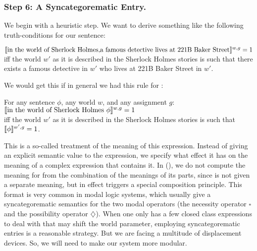 \subsubsection{Step 6: A Syncategorematic Entry.} \label{sec:sync-entry}

We begin with a heuristic step. We want to derive something like the following
truth-conditions for our sentence:

\ex $\llbracket \mbox{in the world of Sherlock Holmes,}\\
  \mbox{a famous detective lives at 221B Baker Street} \rrbracket^{w,g} = 1$\\
iff the world $w'$ as it is described in the Sherlock Holmes stories is such
that there exists a famous detective in $w'$ who lives at 221B Baker Street in
$w'$.
\xe

We would get this if in general we had this rule for :

\ex For any sentence $\phi$, any world $w$, and any assignment $g$:\\
$\llbracket \mbox{in the world of Sherlock Holmes }\phi \rrbracket^{w,g} = 1$\\
iff the world $w'$ as it is described in the Sherlock Holmes stories is such
that $\llbracket \phi \rrbracket^{w',g} = 1$.
\xe

This is a so-called  treatment of the meaning of this
expression. Instead of giving an explicit semantic value to the expression, we
specify what effect it has on the meaning of a complex expression that contains
it. In (\lastx), we do not compute the meaning for  from the combination of the meanings of its parts,
since  is not given a separate
meaning, but in effect triggers a special composition principle. This %
%
format is very common in modal logic systems, which usually give a
syncategorematic semantics for the two modal operators (the necessity operator
$\square$ and the possibility operator $\diamondsuit$). When one only has a few
closed class expressions to deal with that may shift the world parameter,
employing syncategorematic entries is a reasonable strategy. But we are facing a
multitude of displacement devices. So, we will need to make our system more
modular.


